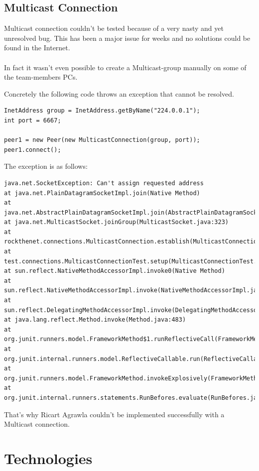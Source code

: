 \documentclass[11pt, a4paper]{article}
\begin{document}
\subsection{Multicast Connection}

Multicast connection couldn't be tested because of a very nasty and yet unresolved bug. This has been a major issue for weeks and no solutions could be found in the Internet. 
\\\\
In fact it wasn't even possible to create a Multicast-group manually on some of the team-members PCs.

Concretely the following code throws an exception that cannot be resolved. 

\begin{lstlisting}
InetAddress group = InetAddress.getByName("224.0.0.1");
int port = 6667;

peer1 = new Peer(new MulticastConnection(group, port));
peer1.connect();
\end{lstlisting}

The exception is as follows:

\begin{lstlisting}
java.net.SocketException: Can't assign requested address
at java.net.PlainDatagramSocketImpl.join(Native Method)
at java.net.AbstractPlainDatagramSocketImpl.join(AbstractPlainDatagramSocketImpl.java:178)
at java.net.MulticastSocket.joinGroup(MulticastSocket.java:323)
at rockthenet.connections.MulticastConnection.establish(MulticastConnection.java:48)
at test.connections.MulticastConnectionTest.setup(MulticastConnectionTest.java:29)
at sun.reflect.NativeMethodAccessorImpl.invoke0(Native Method)
at sun.reflect.NativeMethodAccessorImpl.invoke(NativeMethodAccessorImpl.java:62)
at sun.reflect.DelegatingMethodAccessorImpl.invoke(DelegatingMethodAccessorImpl.java:43)
at java.lang.reflect.Method.invoke(Method.java:483)
at org.junit.runners.model.FrameworkMethod$1.runReflectiveCall(FrameworkMethod.java:47)
at org.junit.internal.runners.model.ReflectiveCallable.run(ReflectiveCallable.java:12)
at org.junit.runners.model.FrameworkMethod.invokeExplosively(FrameworkMethod.java:44)
at org.junit.internal.runners.statements.RunBefores.evaluate(RunBefores.java:24)
\end{lstlisting}

That's why Ricart Agrawla couldn't be implemented successfully with a Multicast connection. 

\newpage

\section{Technologies}
\end{document}
